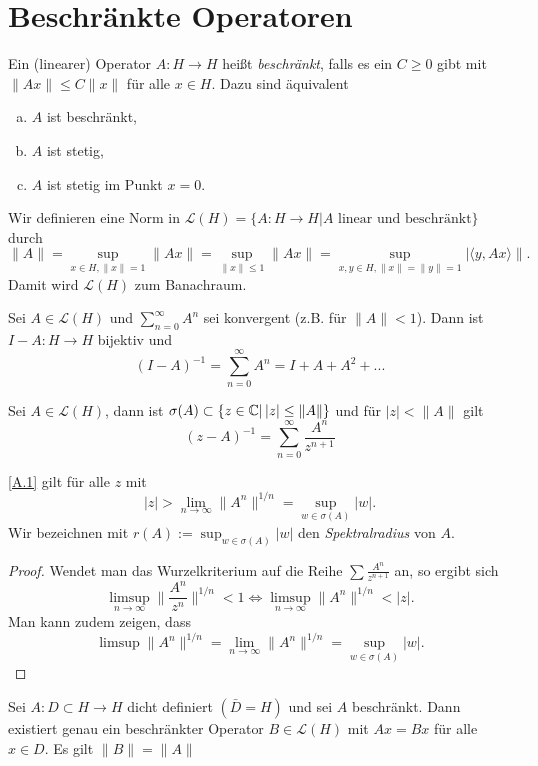 \documentclass{mycourse}
\begin{document}
\section{Beschränkte Operatoren}
Ein (linearer) Operator $A:H\to H$ heißt \emph{beschränkt}, falls es ein $C\ge 0$ gibt mit $\|Ax\| \le C\|x\|$ für alle $x\in H$. Dazu sind äquivalent
\begin{enumerate}[a)]
\item $A$ ist beschränkt,
\item $A$ ist stetig,
\item $A$ ist stetig im Punkt $x=0$.
\end{enumerate} 
Wir definieren eine Norm in $\mathcal L(H)=\{A: H\to H| A \text{ linear und beschränkt}\}$ durch
\[
\|A\|=\sup_{x\in H, \|x\|=1} \|Ax\|= \sup_{\|x\|\le 1} \|Ax\|=\sup_{x,y\in H, \|x\|=\|y\|=1} |\langle y, Ax\rangle\|.
\]
Damit wird $\mathcal L(H)$ zum Banachraum.
\begin{st}[Neumannreihe]
Sei $A\in \mathcal L(H)$ und 
$\sum_{n=0}^\infty A^n$ sei konvergent (z.B. für $\|A\|<1$). Dann ist $I-A: H\to H$ bijektiv und
\[
(I-A)^{-1}=\sum_{n=0}^\infty A^n=I+A+A^2+...
\]
\end{st}
\begin{st}
Sei $A\in \mathcal L(H)$, dann ist $\sigma(A)\subset \{z\in \mathbb{C} |\, |z|\le \|A\| \}$ und für $|z| < \|A\|$ gilt
\begin{equation}
(z-A)^{-1}=\sum_{n=0}^\infty \frac{A^n}{z^{n+1}} \label{A.1}
\end{equation}
\end{st}
\begin{nt*}
\eqref{A.1} gilt für alle $z$  mit
\[
|z| > \lim_{n\to \infty} \|A^n\|^{1/n}=\sup_{w\in \sigma(A)} |w|.
\]
Wir bezeichnen mit $r(A):= \sup_{w\in \sigma(A)} |w|$ den \emph{Spektralradius} von $A$.
\end{nt*}
\begin{proof}
Wendet man das Wurzelkriterium auf die Reihe $\sum \frac{A^n}{z^{n+1}}$ an, so ergibt sich
\[
\limsup_{n\to \infty} \big \|\frac{A^n}{z^n} \big \|^{1/n} <1 \iff \limsup_{n\to \infty} \|A^n\|^{1/n}< |z|.
\]
Man kann zudem zeigen, dass
\[
\limsup\|A^n\|^{1/n} = \lim_{n\to \infty} \|A^n\|^{1/n}=\sup_{w\in \sigma(A)} |w|.
\]
\end{proof}
\begin{st} \label{A.3}
Sei $A:D\subset H\to H$ dicht definiert $(\bar D=H)$ und sei $A$ beschränkt. Dann existiert genau ein beschränkter Operator $B\in \mathcal L(H)$ mit $Ax=Bx$ für alle $x\in D$. Es gilt $\|B\|=\|A\|$
\end{st}
\end{document}
